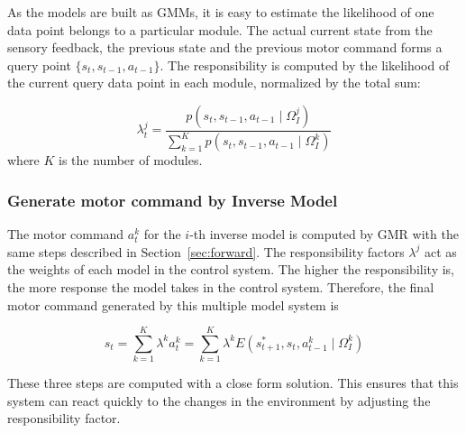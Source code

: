 As the models are built as GMMs, it is easy to estimate the likelihood of one data point belongs to a particular module. The actual current state from the sensory feedback, the previous state and the previous motor command forms a query point $\{s_t,s_{t-1},a_{t-1}\}$. The responsibility is computed by the likelihood of the current query data point in each module, normalized by the total sum:

\begin{equation}
\lambda^j_t = \frac{p(s_t,s_{t-1},a_{t-1}\mid \Omega_I^j)}{\sum_{k=1}^{K}{p(s_t,s_{t-1},a_{t-1}\mid \Omega_I^k)}}
\end{equation}
where $K$ is the number of modules.


\subsubsection{Generate motor command by Inverse Model}
\label{sec:inverse}

The motor command $a^k_t$ for the $i$-th inverse model is computed by GMR with the same steps  described in Section~\ref{sec:forward}. The responsibility factors $\lambda^j$ act as the weights of each model in the control system. The higher the responsibility is, the more response the model takes in the control system. Therefore, the final motor command generated by this multiple model system is

\begin{equation}
\label{e_mix}
s_t = \sum_{k=1}^K{\lambda^k a_t^k} = \sum_{k=1}^K{\lambda^k E\left({s^*_{t+1},s_t, a^k_{t-1} \mid \Omega^k_I}\right)}
\end{equation}

These three steps are computed with a close form solution. This ensures that this system can react quickly to the changes in the environment by adjusting the responsibility factor.



